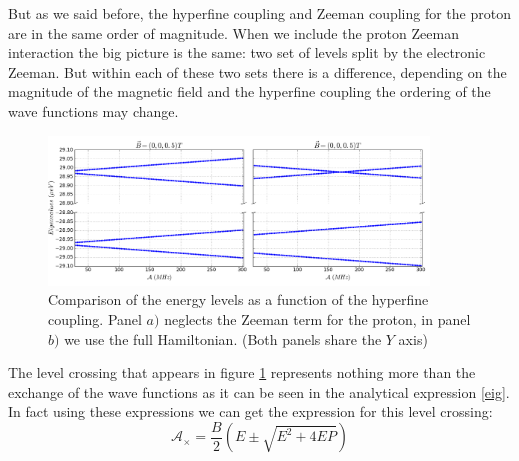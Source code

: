 But as we said before, the hyperfine coupling and Zeeman coupling for the proton are in the same order of magnitude. When we include the proton Zeeman interaction the big picture is the same: two set of levels split by the electronic Zeeman. But within each of these two sets there is a difference, depending on the magnitude of the magnetic field and the hyperfine coupling the ordering of the wave functions may change. 
\begin{figure}[h!]
\centering
\includegraphics[width=0.9\textwidth]{chapter03/figures/pro_nopro.png}
\vspace{-5pt}
\renewcommand{\figurename}{\footnotesize{\textsc{Figure}}}
\caption{Comparison of the energy levels as a function of the hyperfine coupling. Panel $a)$ neglects the Zeeman term for the proton, in panel $b)$ we use the full Hamiltonian. (Both panels share the $Y$ axis)}
\label{proton}
\end{figure}
\FloatBarrier
The level crossing that appears in figure \ref{proton} represents nothing more than the exchange of the wave functions as it can be seen in the analytical expression \eqref{eig}. In fact using these expressions we can get the expression for this level crossing:
\begin{equation}
  \mathcal{A}_{\times}=\frac{B}{2}\left(E\pm\sqrt{E^2+4EP}\right)
\end{equation}


